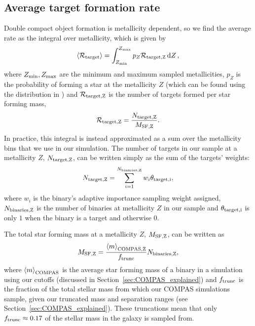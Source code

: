 \subsection{Average target formation rate}
Double compact object formation is metallicity dependent, so we find the average rate as the integral over metallicity, which is given by
\begin{equation}\label{eq:norm_avg_target_formation}
    \avg{ \mathcal{R}_{\rm target} } = \int_{Z_{\rm min}}^{Z_{\rm max}} p_{Z} \mathcal{R}_{\rm target, Z} \dd{Z},
\end{equation}
where $Z_{\rm min}, Z_{\rm max}$ are the minimum and maximum sampled metallicities, $p_Z$ is the probability of forming a star at the metallicity $Z$ (which can be found using the distribution in \citealp{Frankel+2018}) and $\mathcal{R}_{\rm target, Z}$ is the number of targets formed per star forming mass,
\begin{equation}
    \mathcal{R}_{\rm target, Z} =  \frac{N_{\rm target, Z}}{ M_{\rm SF, Z} }.
\end{equation}
In practice, this integral is instead approximated as a sum over the metallicity bins that we use in our simulation. The number of targets in our sample at a metallicity $Z$, $N_{\rm target, Z}$, can be written simply as the sum of the targets' weights:
\begin{equation}
    N_{\rm target, Z} = \sum_{i=1}^{N_{\rm binaries, Z}} w_i \theta_{\rm target, i},
\end{equation}
where $w_i$ is the binary's adaptive importance sampling weight assigned, $N_{\rm binaries, Z}$ is the number of binaries at metallicity $Z$ in our sample and $\theta_{\rm target, i}$ is only $1$ when the binary is a target and otherwise $0$.

The total star forming mass at a metallicity $Z$, $M_{\rm SF, Z}$, can be written as
\begin{equation}
    M_{\rm SF, Z} = \frac{\avg{m}_{\rm COMPAS, Z}}{f_{\rm trunc}} N_{\rm binaries, Z},
\end{equation}
where $\left\langle m\right\rangle_{\rm COMPAS}$ is the average star forming mass of a binary in a simulation using our cutoffs (discussed in Section~\ref{sec:COMPAS_explained}) and $f_{\rm trunc}$ is the fraction of the total stellar mass from which our COMPAS simulations sample, given our truncated mass and separation ranges (see Section~\ref{sec:COMPAS_explained}). These truncations mean that only $f_{\rm trunc} \approx 0.17$ of the stellar mass in the galaxy is sampled from.

